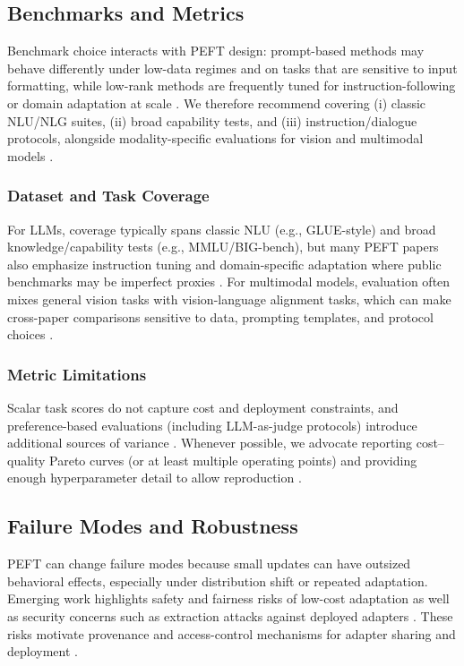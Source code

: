 \documentclass[conference]{IEEEtran}
\begin{document}
\subsection{Benchmarks and Metrics}
Benchmark choice interacts with PEFT design: prompt-based methods may behave differently under low-data regimes and on tasks that are sensitive to input formatting, while low-rank methods are frequently tuned for instruction-following or domain adaptation at scale \cite{li2021prefix,liu2021p,hu2021lora}. We therefore recommend covering (i) classic NLU/NLG suites, (ii) broad capability tests, and (iii) instruction/dialogue protocols, alongside modality-specific evaluations for vision and multimodal models \cite{wang2018glue,hendrycks2020measuring,zheng2023judging,xin2024parameter}.

\subsubsection{Dataset and Task Coverage}
For LLMs, coverage typically spans classic NLU (e.g., GLUE-style) and broad knowledge/capability tests (e.g., MMLU/BIG-bench), but many PEFT papers also emphasize instruction tuning and domain-specific adaptation where public benchmarks may be imperfect proxies \cite{wang2018glue,hendrycks2020measuring,srivastava2022beyond,han2024parameter}. For multimodal models, evaluation often mixes general vision tasks with vision-language alignment tasks, which can make cross-paper comparisons sensitive to data, prompting templates, and protocol choices \cite{radford2021learning,prottasha2025peft}.

\subsubsection{Metric Limitations}
Scalar task scores do not capture cost and deployment constraints, and preference-based evaluations (including LLM-as-judge protocols) introduce additional sources of variance \cite{zheng2023judging}. Whenever possible, we advocate reporting cost--quality Pareto curves (or at least multiple operating points) and providing enough hyperparameter detail to allow reproduction \cite{han2024parameter,chen2023parameter}.

\subsection{Failure Modes and Robustness}
PEFT can change failure modes because small updates can have outsized behavioral effects, especially under distribution shift or repeated adaptation. Emerging work highlights safety and fairness risks of low-cost adaptation as well as security concerns such as extraction attacks against deployed adapters \cite{taraghi2025efficiency,wang2025stolenlora}. These risks motivate provenance and access-control mechanisms for adapter sharing and deployment \cite{pfeiffer2020adapterhub,taraghi2025efficiency}.
\end{document}
